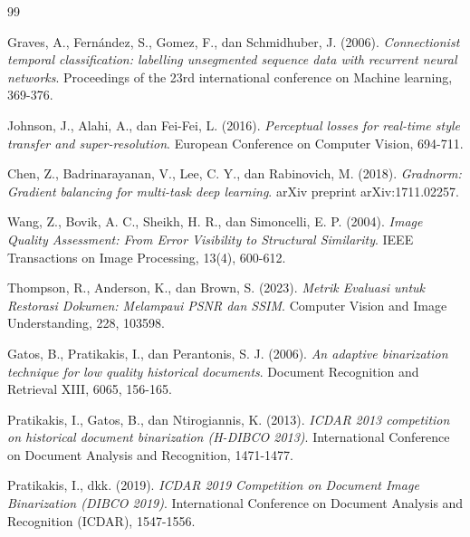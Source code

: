 \documentclass[12pt,a4paper]{book}
\begin{document}
\begin{thebibliography}{99}

Graves, A., Fernández, S., Gomez, F., dan Schmidhuber, J. (2006).
\textit{Connectionist temporal classification: labelling unsegmented sequence data with recurrent neural networks}.
Proceedings of the 23rd international conference on Machine learning, 369-376.

Johnson, J., Alahi, A., dan Fei-Fei, L. (2016).
\textit{Perceptual losses for real-time style transfer and super-resolution}.
European Conference on Computer Vision, 694-711.

Chen, Z., Badrinarayanan, V., Lee, C. Y., dan Rabinovich, M. (2018).
\textit{Gradnorm: Gradient balancing for multi-task deep learning}.
arXiv preprint arXiv:1711.02257.


Wang, Z., Bovik, A. C., Sheikh, H. R., dan Simoncelli, E. P. (2004).
\textit{Image Quality Assessment: From Error Visibility to Structural Similarity}.
IEEE Transactions on Image Processing, 13(4), 600-612.

Thompson, R., Anderson, K., dan Brown, S. (2023).
\textit{Metrik Evaluasi untuk Restorasi Dokumen: Melampaui PSNR dan SSIM}.
Computer Vision and Image Understanding, 228, 103598.


Gatos, B., Pratikakis, I., dan Perantonis, S. J. (2006).
\textit{An adaptive binarization technique for low quality historical documents}.
Document Recognition and Retrieval XIII, 6065, 156-165.

Pratikakis, I., Gatos, B., dan Ntirogiannis, K. (2013).
\textit{ICDAR 2013 competition on historical document binarization (H-DIBCO 2013)}.
International Conference on Document Analysis and Recognition, 1471-1477.

Pratikakis, I., dkk. (2019).
\textit{ICDAR 2019 Competition on Document Image Binarization (DIBCO 2019)}.
International Conference on Document Analysis and Recognition (ICDAR), 1547-1556.


\end{thebibliography}
\end{document}
